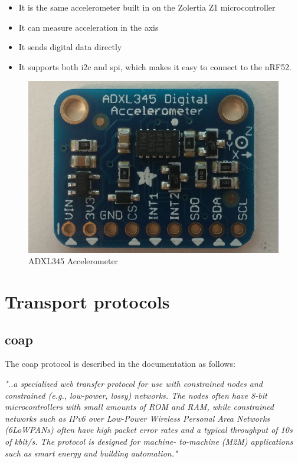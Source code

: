 \begin{itemize}
  \item It is the same accelerometer built in on the Zolertia Z1 microcontroller
  \item It can measure acceleration in the axis
  \item It sends digital data directly
  \item It supports both \gls{i2c} and \gls{spi}, which makes it easy to connect to the nRF52. 
\end{itemize}


\begin{figure}[h]
    \centering
    \includegraphics[scale=0.32]{ADXL345.png}    \caption{ADXL345 Accelerometer}
    \label{fig:adxl345}
\end{figure}

\newpage

\section{Transport protocols}



\subsection{\gls{coap}}

The \gls{coap} protocol is described in the documentation as follows: 

\textit{"..a specialized web
   transfer protocol for use with constrained nodes and constrained
   (e.g., low-power, lossy) networks.  The nodes often have 8-bit
   microcontrollers with small amounts of ROM and RAM, while constrained
   networks such as IPv6 over Low-Power Wireless Personal Area Networks
   (6LoWPANs) often have high packet error rates and a typical
   throughput of 10s of kbit/s.  The protocol is designed for machine-
   to-machine (M2M) applications such as smart energy and building
   automation." } \cite{shelby2014constrained}
   


